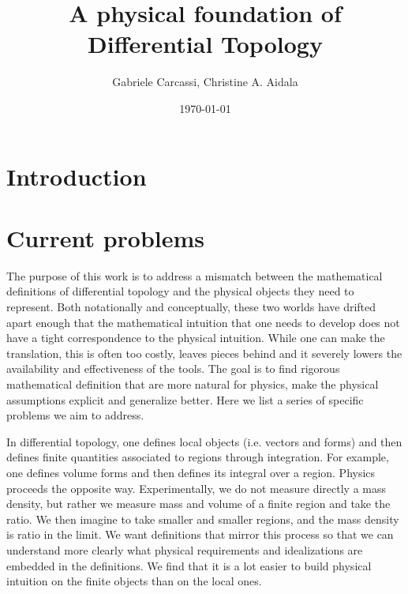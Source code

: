 \documentclass[10pt,twocolumn, nofootinbib]{revtex4-2}
\begin{document}
\title{A physical foundation of Differential Topology}
\author{Gabriele Carcassi, Christine A. Aidala}

\date{\today}


\begin{abstract}

\end{abstract}

\maketitle

\section{Introduction}

\section{Current problems}

The purpose of this work is to address a mismatch between the mathematical definitions of differential topology and the physical objects they need to represent. Both notationally and conceptually, these two worlds have drifted apart enough that the mathematical intuition that one needs to develop does not have a tight correspondence to the physical intuition. While one can make the translation, this is often too costly, leaves pieces behind and it severely lowers the availability and effectiveness of the tools. The goal is to find rigorous mathematical definition that are more natural for physics, make the physical assumptions explicit and generalize better. Here we list a series of specific problems we aim to address.

In differential topology, one defines local objects (i.e. vectors and forms) and then defines finite quantities associated to regions through integration. For example, one defines volume forms and then defines its integral over a region. Physics proceeds the opposite way. Experimentally, we do not measure directly a mass density, but rather we measure mass and volume of a finite region and take the ratio. We then imagine to take smaller and smaller regions, and the mass density is ratio in the limit. We want definitions that mirror this process so that we can understand more clearly what physical requirements and idealizations are embedded in the definitions. We find that it is a lot easier to build physical intuition on the finite objects than on the local ones.
\end{document}
